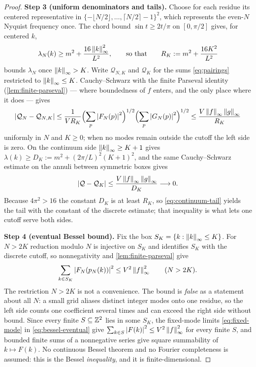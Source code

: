 \begin{proof}
\textbf{Step 3 (uniform denominators and tails).} Choose for each residue its
centered representative in
$\{-\lfloor N/2\rfloor,\dots,\lceil N/2\rceil-1\}^2$, which represents the
even-$N$ Nyquist frequency once. The chord bound $\sin t\ge2t/\pi$ on
$[0,\pi/2]$ gives, for centered $k$,
\begin{equation}\label{eq:uniform-denominator}
  \lambda_N(k)\ge m^2+\frac{16\left\| k \right\|_\infty^2}{L^2},
  \qquad\text{so that}\qquad
  R_K:=m^2+\frac{16K^2}{L^2}
\end{equation}
bounds $\lambda_N$ once $\left\| k \right\|_\infty>K$. Write $\mathcal Q_{N,K}$ and
$\mathcal Q_K$ for the sums \eqref{eq:pairings} restricted to
$\left\| k \right\|_\infty\le K$. Cauchy--Schwarz with the finite Parseval identity
(\cref{lem:finite-parseval}) --- where boundedness of $f$ enters, and the only
place where it does --- gives
\begin{equation}\label{eq:discrete-tail}
  \left| \mathcal Q_N-\mathcal Q_{N,K} \right|\le\frac{1}{VR_K}
    \Bigl(\sum_p\left| F_N(p) \right|^2\Bigr)^{1/2}
    \Bigl(\sum_p\left| G_N(p) \right|^2\Bigr)^{1/2}
  \le\frac{V\left\| f \right\|_\infty\left\| g \right\|_\infty}{R_K}
\end{equation}
uniformly in $N$ and $K\ge0$; when no modes remain outside the cutoff the left
side is zero. On the continuum side $\left\| k \right\|_\infty\ge K+1$ gives
$\lambda(k)\ge D_K:=m^2+(2\pi/L)^2(K+1)^2$, and the same Cauchy--Schwarz
estimate on the annuli between symmetric boxes gives
\begin{equation}\label{eq:continuum-tail}
  \left| \mathcal Q-\mathcal Q_K \right|
  \le\frac{V\left\| f \right\|_\infty\left\| g \right\|_\infty}{D_K}\longrightarrow0 .
\end{equation}
Because $4\pi^2>16$ the constant $D_K$ is at least $R_K$, so
\eqref{eq:continuum-tail} yields the tail with the constant of the discrete
estimate; that inequality is what lets one cutoff serve both sides.

\textbf{Step 4 (eventual Bessel bound).} Fix the box
$S_K=\{k:\left\| k \right\|_\infty\le K\}$. For $N>2K$ reduction modulo $N$ is injective
on $S_K$ and identifies $S_K$ with the discrete cutoff, so nonnegativity and
\cref{lem:finite-parseval} give
\begin{equation}\label{eq:bessel-eventual}
  \sum_{k\in S_K}\left| F_N(p_N(k)) \right|^2\le V^2\left\| f \right\|_\infty^2
  \qquad (N>2K).
\end{equation}
The restriction $N>2K$ is not a convenience. The bound is \emph{false} as a
statement about all $N$: a small grid aliases distinct integer modes onto one
residue, so the left side counts one coefficient several times and can exceed
the right side without bound. Since every finite $S\subseteq\mathbb{Z}^2$ lies in some
$S_K$, the fixed-mode limits \eqref{eq:fixed-mode} in
\eqref{eq:bessel-eventual} give
$\sum_{k\in S}\left| F(k) \right|^2\le V^2\left\| f \right\|_\infty^2$ for every finite $S$, and
bounded finite sums of a nonnegative series give square summability of
$k\mapsto F(k)$. No continuous Bessel theorem and no Fourier completeness is
assumed: this is the Bessel \emph{inequality}, and it is finite-dimensional.


\end{proof}
